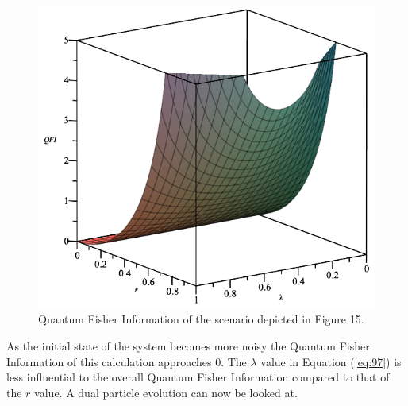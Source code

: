 \documentclass[twocolumn]{article}
\begin{document}
\newline
\begin{figure}[h]
\begin{center}
\includegraphics[width=0.65\linewidth]{Phase-Flip-Lambda-QFI-Graph.png}
\caption{Quantum Fisher Information of the scenario depicted in Figure 15.}
\end{center}
\end{figure}
\newline
As the initial state of the system becomes more noisy the Quantum Fisher Information of this calculation approaches $0$. The $\lambda$ value in Equation (\ref{eq:97}) is less influential to the overall Quantum Fisher Information compared to that of the $r$ value. A dual particle evolution can now be looked at.
\end{document}
